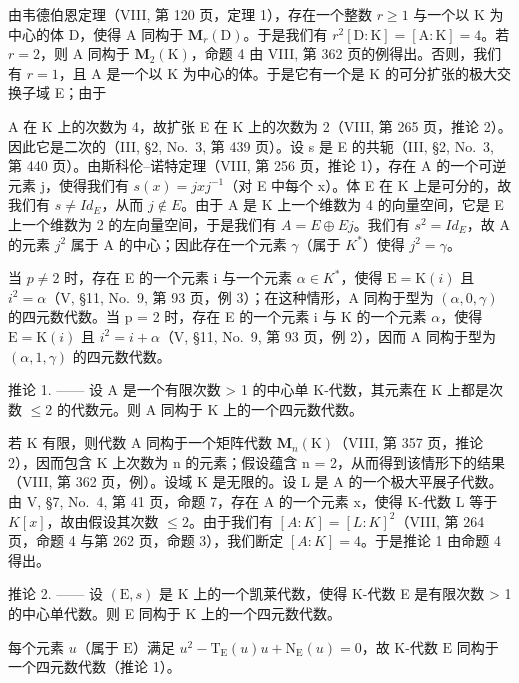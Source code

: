 由韦德伯恩定理（VIII, 第 120 页，定理 1），存在一个整数 \(r \geqslant 1\) 与一个以 K 为中心的体 D，使得 A 同构于 \(\mathbf{M}_r(\mathrm{D})\)。于是我们有 \(r^2[\mathrm{D}:\mathrm{K}] = [\mathrm{A}:\mathrm{K}] = 4\)。若 \(r = 2\)，则 A 同构于 \(\mathbf{M}_2(\mathrm{K})\)，命题 4 由 VIII, 第 362 页的例得出。否则，我们有 \(r = 1\)，且 A 是一个以 K 为中心的体。于是它有一个是 K 的可分扩张的极大交换子域 E；由于

A 在 K 上的次数为 4，故扩张 E 在 K 上的次数为 2（VIII, 第 265 页，推论 2）。因此它是二次的（III, §2, No.~3, 第 439 页）。设 s 是 E 的共轭（III, §2, No.~3, 第 440 页）。由斯科伦--诺特定理（VIII, 第 256 页，推论 1），存在 A 的一个可逆元素 j，使得我们有 \(s(x) = jxj^{-1}\)（对 E 中每个 x）。体 E 在 K 上是可分的，故我们有 \(s \neq Id_{E}\)，从而 \(j \notin E\)。由于 A 是 K 上一个维数为 4 的向量空间，它是 E 上一个维数为 2 的左向量空间，于是我们有 \(A = E \oplus Ej\)。我们有 \(s^{2} = Id_{E}\)，故 A 的元素 \(j^{2}\) 属于 A 的中心；因此存在一个元素 \(\gamma\)（属于 \(K^{*}\)）使得 \(j^{2} = \gamma\)。

当 \(p \neq 2\) 时，存在 E 的一个元素 i 与一个元素 \(\alpha \in K^{*}\)，使得 \(\mathrm{E} = \mathrm{K}(i)\) 且 \(i^{2} = \alpha\)（V, §11, No.~9, 第 93 页，例 3）；在这种情形，A 同构于型为 \((\alpha, 0, \gamma)\) 的四元数代数。当 p = 2 时，存在 E 的一个元素 i 与 K 的一个元素 \(\alpha\)，使得 \(\mathrm{E} = \mathrm{K}(i)\) 且 \(i^{2} = i + \alpha\)（V, §11, No.~9, 第 93 页，例 2），因而 A 同构于型为 \((\alpha, 1, \gamma)\) 的四元数代数。

推论 1. —— 设 A 是一个有限次数 \textgreater{} 1 的中心单 K-代数，其元素在 K 上都是次数 \(\leqslant 2\) 的代数元。则 A 同构于 K 上的一个四元数代数。

若 K 有限，则代数 A 同构于一个矩阵代数 \(\mathbf{M}_{n}(\mathrm{K})\)（VIII, 第 357 页，推论 2），因而包含 K 上次数为 n 的元素；假设蕴含 n = 2，从而得到该情形下的结果（VIII, 第 362 页，例）。设域 K 是无限的。设 L 是 A 的一个极大平展子代数。由 V, §7, No.~4, 第 41 页，命题 7，存在 A 的一个元素 x，使得 K-代数 L 等于 \(K[x]\)，故由假设其次数 \(\leqslant 2\)。由于我们有 \([A : K] = [L : K]^{2}\)（VIII, 第 264 页，命题 4 与第 262 页，命题 3），我们断定 \([A : K] = 4\)。于是推论 1 由命题 4 得出。

推论 2. —— 设 \((\mathrm{E}, s)\) 是 K 上的一个凯莱代数，使得 K-代数 E 是有限次数 \textgreater{} 1 的中心单代数。则 E 同构于 K 上的一个四元数代数。

每个元素 \(u\)（属于 \(\mathrm{E}\)）满足 \(u^2 - \mathrm{T}_{\mathrm{E}}(u)u + \mathrm{N}_{\mathrm{E}}(u) = 0\)，故 K-代数 \(\mathrm{E}\) 同构于一个四元数代数（推论 1）。

